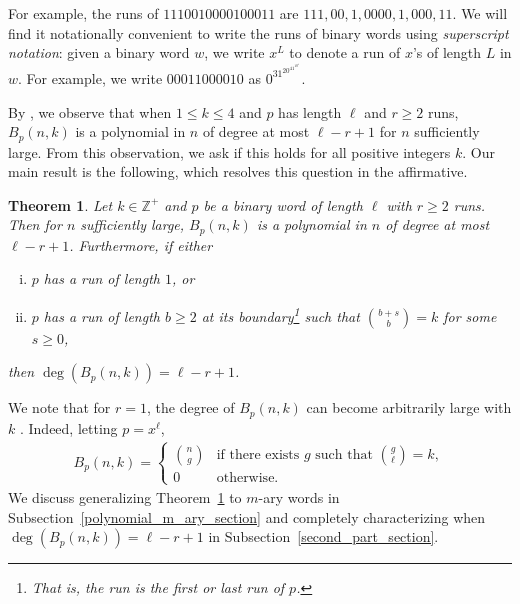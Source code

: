 \documentclass[11pt]{amsart}
\newtheorem{theorem}{Theorem}[section]
\newtheorem{definition}[theorem]{Definition}
\newcommand{\ZZ}{\mathbb{Z}}
\begin{document}
For example, the runs of $1110010000100011$ are $111,00,1,0000,1,000,11$. We will find it notationally convenient to write the runs of binary words using \emph{superscript notation}: given a binary word $w$, we write $x^L$ to denote a run of $x$'s of length $L$ in $w$. For example, we write $00011000010$ as $0^31^20^41^10^1$.

By \cite[Propositions 3.2, 3.4, 3.8, 3.11]{subseq_freq}, we observe that when $1\leq k\leq 4$ and $p$ has length $\ell$ and $r\geq2$ runs, $B_p(n,k)$ is a polynomial in $n$ of degree at most $\ell-r+1$ for $n$ sufficiently large. From this observation, we ask if this holds for all positive integers $k$. Our main result is the following, which resolves this question in the affirmative.

\begin{theorem}\label{polynomial_theorem}
    Let $k\in\ZZ^+$ and $p$ be a binary word of length $\ell$ with $r\geq2$ runs. Then for $n$ sufficiently large, $B_p(n,k)$ is a polynomial in $n$ of degree at most $\ell-r+1$. Furthermore, if either
    \begin{enumerate}[(i)]
        \item $p$ has a run of length $1$, or
        \item $p$ has a run of length $b\geq2$ at its boundary\footnote{That is, the run is the first or last run of $p$.} such that ${b+s\choose b}=k$ for some $s\geq0$,
    \end{enumerate}
    then $\deg (B_p(n,k))=\ell-r+1$.
\end{theorem}

We note that for $r=1$, the degree of $B_p(n,k)$ can become arbitrarily large with $k$ \cite{noah_communication}. Indeed, letting $p=x^{\ell}$,
\begin{align*}
    B_{p}(n,k)=\begin{cases}
        {n\choose g} & \text{if~there exists~} g \text{~such that~} {g\choose\ell}=k,\\
        0 & \text{otherwise.}
    \end{cases}
\end{align*}
We discuss generalizing Theorem~\ref{polynomial_theorem} to $m$-ary words in Subsection~\ref{polynomial_m_ary_section} and completely characterizing when $\deg (B_p(n,k))=\ell-r+1$ in Subsection~\ref{second_part_section}.
\end{document}
